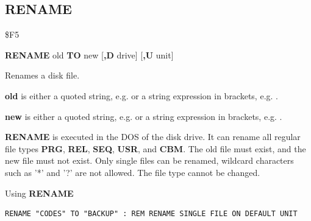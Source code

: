 \subsection{RENAME}
\begin{description}[leftmargin=2cm,style=nextline]
\item [Token:]    \$F5

\item [Format:]   {\bf RENAME} old {\bf TO} new [{\bf,D} drive] [{\bf,U} unit]

\item [Usage:]    Renames a disk file.

                  {\bf old} is either a quoted string, e.g.  or a string expression in brackets, e.g. .

                  {\bf new} is either a quoted string, e.g.  or a string expression in brackets, e.g. .

                  \drivedefinition

                  \unitdefinition

\item [Remarks:]  {\bf RENAME} is executed in the DOS of the disk drive. It can rename all regular file types {\bf PRG}, {\bf REL}, {\bf SEQ}, {\bf USR}, and {\bf CBM}. The old file must exist, and the new file must not exist. Only single files can be renamed, wildcard characters such as '*' and '?' are not allowed. The file type cannot be changed.

\item [Example:]  Using {\bf RENAME}

\begin{tcolorbox}[colback=black,coltext=white]
\verbatimfont{\codefont}
\begin{verbatim}
RENAME "CODES" TO "BACKUP" : REM RENAME SINGLE FILE ON DEFAULT UNIT
\end{verbatim}
\end{tcolorbox}
\end{description}


\newpage
